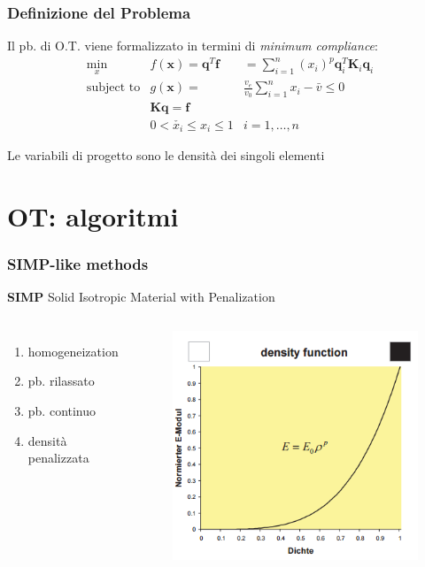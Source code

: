 \documentclass{beamer}
\begin{document}
\begin{frame}
	\frametitle{Definizione del Problema}
	Il pb. di O.T. viene formalizzato in termini di \textit{minimum compliance}:
	\begin{eqnarray}
	\underset{x}{\text{min}} & f(\mathbf{x}) = \mathbf{q}^T \mathbf{f} & = \sum_{i=1}^{n}(x_i)^p \mathbf{q}_i^T \mathbf{K}_i \mathbf{q}_i \\
	\text{subject to} & g(\mathbf{x}) = & \frac{v_e}{v_0} \sum_{i=1}^{n}x_i - \bar{v} \leq 0 \\
	& \mathbf{K} \mathbf{q} = \mathbf{f} &  \\
	& 0 < \check{x_i} \leq x_i \leq 1  & i=1,\ldots, n
	\end{eqnarray}
	
	Le variabili di progetto sono le densit\`{a} dei singoli elementi
	
\end{frame}

\section{OT: algoritmi}


\begin{frame}
	\frametitle{SIMP-like methods}
	\textbf{SIMP} Solid Isotropic Material with Penalization
	\begin{columns}[c] %
		
		\begin{enumerate}
			\item homogeneization
			\item pb. rilassato
			\item pb. continuo
			\item densit\`{a} penalizzata
		\end{enumerate}
		
		\begin{figure}
			\includegraphics[width=0.7\linewidth]{./images/hom.png}
		\end{figure}
	\end{columns}		
\end{frame}
\end{document}
